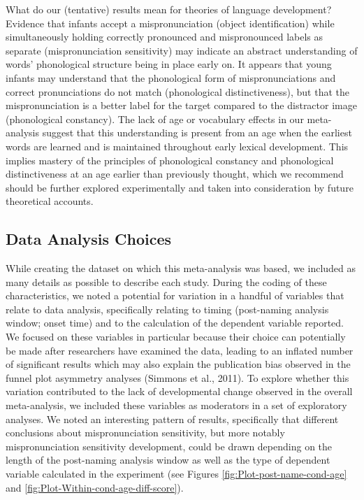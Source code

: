 \documentclass[man]{apa6}
\theoremstyle{definition}
\theoremstyle{definition}
\theoremstyle{definition}
\theoremstyle{remark}
\begin{document}
What do our (tentative) results mean for theories of language
development? Evidence that infants accept a mispronunciation (object
identification) while simultaneously holding correctly pronounced and
mispronounced labels as separate (mispronunciation sensitivity) may
indicate an abstract understanding of words' phonological structure
being in place early on. It appears that young infants may understand
that the phonological form of mispronunciations and correct
pronunciations do not match (phonological distinctiveness), but that the
mispronunciation is a better label for the target compared to the
distractor image (phonological constancy). The lack of age or vocabulary
effects in our meta-analysis suggest that this understanding is present
from an age when the earliest words are learned and is maintained
throughout early lexical development. This implies mastery of the
principles of phonological constancy and phonological distinctiveness at
an age earlier than previously thought, which we recommend should be
further explored experimentally and taken into consideration by future
theoretical accounts.

\subsection{Data Analysis Choices}\label{data-analysis-choices}

While creating the dataset on which this meta-analysis was based, we
included as many details as possible to describe each study. During the
coding of these characteristics, we noted a potential for variation in a
handful of variables that relate to data analysis, specifically relating
to timing (post-naming analysis window; onset time) and to the
calculation of the dependent variable reported. We focused on these
variables in particular because their choice can potentially be made
after researchers have examined the data, leading to an inflated number
of significant results which may also explain the publication bias
observed in the funnel plot asymmetry analyses (Simmons et al., 2011).
To explore whether this variation contributed to the lack of
developmental change observed in the overall meta-analysis, we included
these variables as moderators in a set of exploratory analyses. We noted
an interesting pattern of results, specifically that different
conclusions about mispronunciation sensitivity, but more notably
mispronunciation sensitivity development, could be drawn depending on
the length of the post-naming analysis window as well as the type of
dependent variable calculated in the experiment (see Figures
\ref{fig:Plot-post-name-cond-age} and
\ref{fig:Plot-Within-cond-age-diff-score}).
\end{document}
